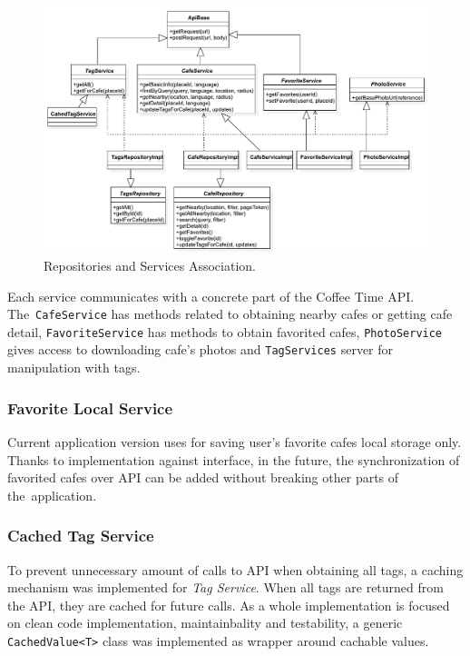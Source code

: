 \begin{figure}[ht]
    \centering
    \includegraphics[width=\textwidth]{img/implementation/repo-services.pdf}
    \caption{Repositories and Services Association.}
    \label{fig:ct-repo-services}
\end{figure}

Each service communicates with a concrete part of the Coffee Time API. The~\verb|CafeService| has methods related to obtaining nearby cafes or getting cafe detail, \verb|FavoriteService| has methods to obtain favorited cafes, \verb|PhotoService| gives access to downloading cafe's photos and \verb|TagServices| server for manipulation with tags. 

\subsubsection{Favorite Local Service}
Current application version uses for saving user's favorite cafes local storage only. Thanks to implementation against interface, in the future, the synchronization of favorited cafes over API can be added without breaking other parts of the~application. 

\subsubsection{Cached Tag Service}
To prevent unnecessary amount of calls to API when obtaining all tags, a caching mechanism was implemented for \textit{Tag Service}. When all tags are returned from the API, they are cached for future calls. As a whole implementation is focused on clean code implementation, maintainbality and testability, a generic \verb|CachedValue<T>| class was implemented as wrapper around cachable values. 

